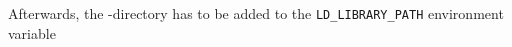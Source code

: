 %
%

Afterwards, the \marktool{\boostname}-directory has to be added to the \verb+LD_LIBRARY_PATH+ environment variable

\begingroup
\lstset{breaklines = true}

\endgroup 